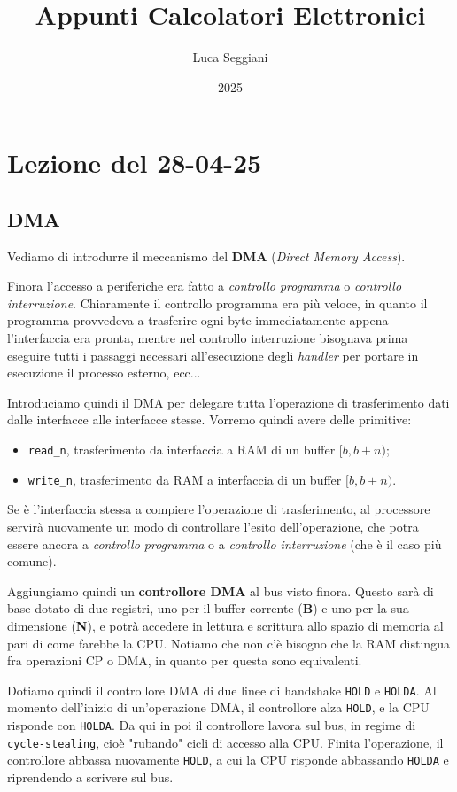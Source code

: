 \documentclass[a4paper,11pt]{article}
\title{Appunti Calcolatori Elettronici}
\author{Luca Seggiani}
\date{2025}
\begin{document}
\section{Lezione del 28-04-25}

\thispagestyle{empty}
\pagestyle{fancy}

\subsection{DMA}
Vediamo di introdurre il meccanismo del \textbf{DMA} (\textit{Direct Memory Access}).

Finora l'accesso a periferiche era fatto a \textit{controllo programma} o \textit{controllo interruzione}.
Chiaramente il controllo programma era più veloce, in quanto il programma provvedeva a trasferire ogni byte immediatamente appena l'interfaccia era pronta, mentre nel controllo interruzione bisognava prima eseguire tutti i passaggi necessari all'esecuzione degli \textit{handler} per portare in esecuzione il processo esterno, ecc... 

Introduciamo quindi il DMA per delegare tutta l'operazione di trasferimento dati dalle interfacce alle interfacce stesse.
Vorremo quindi avere delle primitive:
\begin{itemize}
	\item \lstinline|read_n|, trasferimento da interfaccia a RAM di un buffer $[b, b + n)$;
	\item \lstinline|write_n|, trasferimento da RAM a interfaccia di un buffer $[b, b+n)$.
\end{itemize}

Se è l'interfaccia stessa a compiere l'operazione di trasferimento, al processore servirà nuovamente un modo di controllare l'esito dell'operazione, che potra essere ancora a \textit{controllo programma} o a \textit{controllo interruzione} (che è il caso più comune).

Aggiungiamo quindi un \textbf{controllore DMA} al bus visto finora.
Questo sarà di base dotato di due registri, uno per il buffer corrente (\textbf{B}) e uno per la sua dimensione (\textbf{N}), e potrà accedere in lettura e scrittura allo spazio di memoria al pari di come farebbe la CPU.
Notiamo che non c'è bisogno che la RAM distingua fra operazioni CP o DMA, in quanto per questa sono equivalenti.

Dotiamo quindi il controllore DMA di due linee di handshake \lstinline|HOLD| e \lstinline|HOLDA|. 
Al momento dell'inizio di un'operazione DMA, il controllore alza \lstinline|HOLD|, e la CPU risponde con \lstinline|HOLDA|.
Da qui in poi il controllore lavora sul bus, in regime di \lstinline|cycle-stealing|, cioè "rubando" cicli di accesso alla CPU.
Finita l'operazione, il controllore abbassa nuovamente \lstinline|HOLD|, a cui la CPU risponde abbassando \lstinline|HOLDA| e riprendendo a scrivere sul bus.
\end{document}
